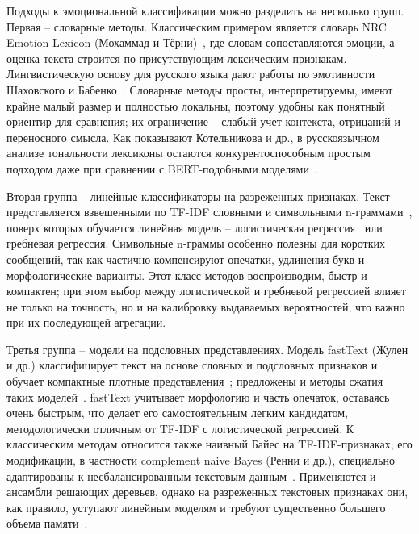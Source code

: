 \documentclass[12pt,a4paper]{report}
\begin{document}
Подходы к эмоциональной классификации можно разделить на несколько групп. Первая -- словарные методы. Классическим примером является словарь NRC Emotion Lexicon (Мохаммад и Тёрни)~\cite{mohammad2013nrc}, где словам сопоставляются эмоции, а оценка текста строится по присутствующим лексическим признакам. Лингвистическую основу для русского языка дают работы по эмотивности Шаховского и Бабенко~\cite{shakhovsky2008emotions,babenko1989emotionlexis}. Словарные методы просты, интерпретируемы, имеют крайне малый размер и полностью локальны, поэтому удобны как понятный ориентир для сравнения; их ограничение -- слабый учет контекста, отрицаний и переносного смысла. Как показывают Котельникова и др., в русскоязычном анализе тональности лексиконы остаются конкурентоспособным простым подходом даже при сравнении с BERT-подобными моделями~\cite{kotelnikova2021lexiconbert}.

Вторая группа -- линейные классификаторы на разреженных признаках. Текст представляется взвешенными по TF-IDF словными и символьными n-граммами~\cite{salton1988termweighting,manning2008ir}, поверх которых обучается линейная модель -- логистическая регрессия~\cite{cox1958logistic,hastie2009esl} или гребневая регрессия. Символьные n-граммы особенно полезны для коротких сообщений, так как частично компенсируют опечатки, удлинения букв и морфологические варианты. Этот класс методов воспроизводим, быстр и компактен; при этом выбор между логистической и гребневой регрессией влияет не только на точность, но и на калибровку выдаваемых вероятностей, что важно при их последующей агрегации.

Третья группа -- модели на подсловных представлениях. Модель fastText (Жулен и др.) классифицирует текст на основе словных и подсловных признаков и обучает компактные плотные представления~\cite{joulin2016fasttext}; предложены и методы сжатия таких моделей~\cite{joulin2016fasttextzip}. fastText учитывает морфологию и часть опечаток, оставаясь очень быстрым, что делает его самостоятельным легким кандидатом, методологически отличным от TF-IDF с логистической регрессией. К классическим методам относится также наивный Байес на TF-IDF-признаках; его модификации, в частности complement naive Bayes (Ренни и др.), специально адаптированы к несбалансированным текстовым данным~\cite{rennie2003nb}. Применяются и ансамбли решающих деревьев, однако на разреженных текстовых признаках они, как правило, уступают линейным моделям и требуют существенно большего объема памяти~\cite{hastie2009esl}.
\end{document}

